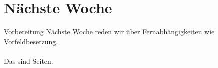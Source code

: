 \section{Nächste Woche}

\begin{frame}
  {Vorbereitung}
  \onslide<+->
  \onslide<+->
  \centering 
  \large
  Nächste Woche reden wir über Fernabhängigkeiten wie Vorfeldbesetzung.\\
  \onslide<+->
  \Zeile
  \\
  \onslide<+->
  \Viertelzeile
  Das sind  Seiten.\\
\end{frame}
